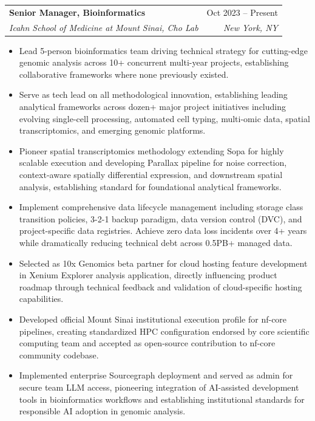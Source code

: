 \documentclass[letterpaper,10]{article}
\makeatletter
\newcommand{\resumeItem}[1]{
  \item\small{
    {#1 \vspace{-2pt}}
  }
}
\newcommand{\resumeSubheading}[4]{
  \vspace{-2pt}\item
    \begin{tabular*}{0.97\textwidth}[t]{l@{\extracolsep{\fill}}r}
      \textbf{#1} & #2 \\
      \textit{\small#3} & \textit{\small #4} \\
    \end{tabular*}\vspace{-7pt}
}
\newcommand{\resumeItemListStart}{\begin{itemize}}
\newcommand{\resumeItemListEnd}{\end{itemize}\vspace{-5pt}}
\makeatother
\begin{document}
    \resumeSubheading
      {Senior Manager, Bioinformatics}{Oct 2023 -- Present}
      {Icahn School of Medicine at Mount Sinai, Cho Lab}{New York, NY}
      \resumeItemListStart
        \resumeItem{Lead 5-person bioinformatics team driving technical strategy for cutting-edge genomic analysis across 10+ concurrent multi-year projects, establishing collaborative frameworks where none previously existed.}
        \resumeItem{Serve as tech lead on all methodological innovation, establishing leading analytical frameworks across dozen+ major project initiatives including evolving single-cell processing, automated cell typing, multi-omic data, spatial transcriptomics, and emerging genomic platforms.}
        \resumeItem{Pioneer spatial transcriptomics methodology extending Sopa for highly scalable execution and developing Parallax pipeline for noise correction, context-aware spatially differential expression, and downstream spatial analysis, establishing standard for foundational analytical frameworks.}
        \resumeItem{Implement comprehensive data lifecycle management including storage class transition policies, 3-2-1 backup paradigm, data version control (DVC), and project-specific data registries. Achieve zero data loss incidents over 4+ years while dramatically reducing technical debt across 0.5PB+ managed data.}
        \resumeItem{Selected as 10x Genomics beta partner for cloud hosting feature development in Xenium Explorer analysis application, directly influencing product roadmap through technical feedback and validation of cloud-specific hosting capabilities.}
        \resumeItem{Developed official Mount Sinai institutional execution profile for nf-core pipelines, creating standardized HPC configuration endorsed by core scientific computing team and accepted as open-source contribution to nf-core community codebase.}
        \resumeItem{Implemented enterprise Sourcegraph deployment and served as admin for secure team LLM access, pioneering integration of AI-assisted development tools in bioinformatics workflows and establishing institutional standards for responsible AI adoption in genomic analysis.}
      \resumeItemListEnd
\end{document}
